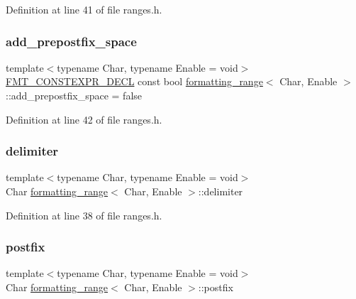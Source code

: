 Definition at line 41 of file ranges.\+h.

\mbox{\label{structformatting__range_afde3ac851d6b0a020fb03d477f3a77b5}} 
\subsubsection{\texorpdfstring{add\+\_\+prepostfix\+\_\+space}{add\_prepostfix\_space}}
{\footnotesize\ttfamily template$<$typename Char, typename Enable = void$>$ \\
\hyperlink{core_8h_af4388801466a5994a363d6005616371a}{F\+M\+T\+\_\+\+C\+O\+N\+S\+T\+E\+X\+P\+R\+\_\+\+D\+E\+CL} const bool \hyperlink{structformatting__range}{formatting\+\_\+range}$<$ Char, Enable $>$\+::add\+\_\+prepostfix\+\_\+space = false\hspace{0.3cm}{\ttfamily [static]}}



Definition at line 42 of file ranges.\+h.

\mbox{\label{structformatting__range_ace2ff20a7fa6d9425f1e099f543f2290}} 
\subsubsection{\texorpdfstring{delimiter}{delimiter}}
{\footnotesize\ttfamily template$<$typename Char, typename Enable = void$>$ \\
Char \hyperlink{structformatting__range}{formatting\+\_\+range}$<$ Char, Enable $>$\+::delimiter}



Definition at line 38 of file ranges.\+h.

\mbox{\label{structformatting__range_a91b4ee512cbb81d6020a33e2d8fec001}} 
\subsubsection{\texorpdfstring{postfix}{postfix}}
{\footnotesize\ttfamily template$<$typename Char, typename Enable = void$>$ \\
Char \hyperlink{structformatting__range}{formatting\+\_\+range}$<$ Char, Enable $>$\+::postfix}



